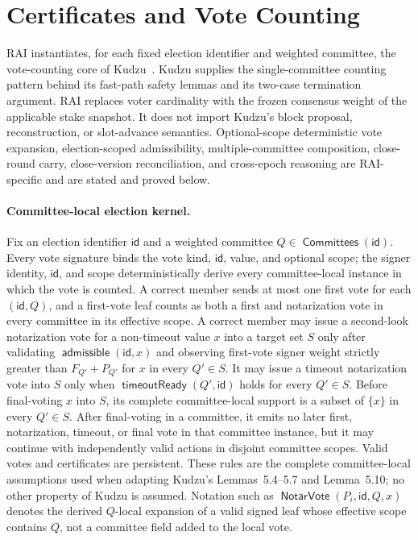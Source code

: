 \documentclass[sigplan,twocolumn,review,anonymous]{acmart}
\newcommand{\func}[1]{\operatorname{\mathsf{#1}}}
\newcommand{\NotarVote}{\func{NotarVote}}
\newcommand{\id}{\mathsf{id}}
\newcommand{\admissible}{\func{admissible}}
\newcommand{\Committees}{\func{Committees}}
\newcommand{\timeoutReady}{\func{timeoutReady}}
\begin{document}
\section{Certificates and Vote Counting}

RAI instantiates, for each fixed election identifier and weighted committee, the vote-counting core of
Kudzu~\cite{shoup2025kudzu}.  Kudzu supplies the single-committee counting pattern behind its
fast-path safety lemmas and its two-case termination argument.  RAI replaces voter cardinality with the
frozen consensus weight of the applicable stake snapshot.  It does not import Kudzu's block proposal,
reconstruction, or slot-advance semantics.  Optional-scope deterministic vote expansion,
election-scoped admissibility, multiple-committee composition, close-round carry, close-version
reconciliation, and cross-epoch reasoning are RAI-specific and are stated and proved below.

\paragraph{Committee-local election kernel.}
Fix an election identifier \(\id\) and a weighted committee \(Q\in\Committees(\id)\).  Every vote
signature binds the vote kind, \(\id\), value, and optional scope; the signer identity, \(\id\), and
scope deterministically derive every committee-local instance in which the vote is counted.  A correct
member sends at most one first vote for each \((\id,Q)\), and a first-vote leaf counts as both a first
and notarization vote in every committee in its effective scope.  A correct member may issue a
second-look notarization vote for a non-timeout value \(x\) into a target set \(S\) only after validating
\(\admissible(\id,x)\) and observing first-vote signer weight strictly greater than
\(F_{Q'}+P_{Q'}\) for \(x\) in every \(Q'\in S\).  It may issue a timeout notarization vote into
\(S\) only when \(\timeoutReady(Q',\id)\) holds for every \(Q'\in S\).  Before final-voting \(x\)
into \(S\), its complete committee-local support is a subset of \(\{x\}\) in every \(Q'\in S\).
After final-voting in a committee, it emits no later first, notarization, timeout, or final vote in that
committee instance, but it may continue with independently valid actions in disjoint committee scopes.
Valid votes and certificates are persistent.  These rules are the complete committee-local assumptions
used when adapting Kudzu's Lemmas~5.4--5.7 and Lemma~5.10; no other property of Kudzu is assumed.
Notation such as \(\NotarVote(P_i,\id,Q,x)\) denotes the derived \(Q\)-local expansion of a valid
signed leaf whose effective scope contains \(Q\), not a committee field added to the local vote.
\end{document}
